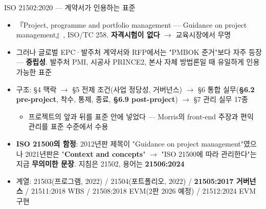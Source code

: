 \begin{frame}[allowframebreaks=1.0]{ISO 21502:2020 — 계약서가 인용하는 표준}
\small
\begin{itemize}
\item\relax 『Project, programme and portfolio management — Guidance on project management』, ISO/TC 258. \textbf{자격시험이 없다} $\rightarrow$ 교육시장에서 무명
\item\relax 그러나 글로벌 EPC·발주처 계약서와 RFP에서는 "PMBOK 준거"보다 자주 등장 — \textbf{중립성}. 발주처 PMI, 시공사 PRINCE2, 본사 자체 방법론일 때 유일하게 인용 가능한 표준
\item\relax 구조: §4 맥락 $\rightarrow$ §5 전제 조건(사업 정당성, 거버넌스) $\rightarrow$ §6 통합 실무(\textbf{§6.2 pre-project}, 착수, 통제, 종료, \textbf{§6.9 post-project}) $\rightarrow$ §7 관리 실무 17종
\par\nobreak
\begin{itemize}
\item\relax 프로젝트의 앞과 뒤를 표준 안에 넣었다 — Morris의 front-end 주장과 편익 관리를 표준 수준에서 수용
\end{itemize}
\item\relax \textbf{ISO 21500의 함정}: 2012년판 제목이 "Guidance on project management"였으나 2021년판은 "\textbf{Context and concepts}" $\rightarrow$ "ISO 21500에 따라 관리한다"는 지금 \textbf{무의미한 문장}. 지침은 21502, 용어는 \textbf{21506:2024}
\item\relax 계열: 21503(프로그램, 2022) / 21504(포트폴리오, 2022) / \textbf{21505:2017 거버넌스} / 21511:2018 WBS / 21508:2018 EVM(2판 2026 예정) / 21512:2024 EVM 구현
\end{itemize}
\end{frame}

